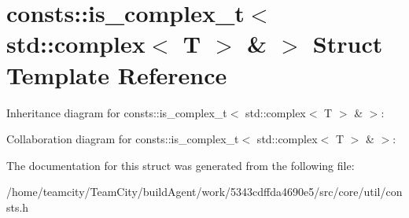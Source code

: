 \hypertarget{structconsts_1_1is__complex__t_3_01std_1_1complex_3_01T_01_4_01_6_01_4}{}\section{consts\+:\+:is\+\_\+complex\+\_\+t$<$ std\+:\+:complex$<$ T $>$ \& $>$ Struct Template Reference}
\label{structconsts_1_1is__complex__t_3_01std_1_1complex_3_01T_01_4_01_6_01_4}


Inheritance diagram for consts\+:\+:is\+\_\+complex\+\_\+t$<$ std\+:\+:complex$<$ T $>$ \& $>$\+:


Collaboration diagram for consts\+:\+:is\+\_\+complex\+\_\+t$<$ std\+:\+:complex$<$ T $>$ \& $>$\+:


The documentation for this struct was generated from the following file\+:\begin{DoxyCompactItemize}
\item 
/home/teamcity/\+Team\+City/build\+Agent/work/5343cdffda4690e5/src/core/util/consts.\+h\end{DoxyCompactItemize}
